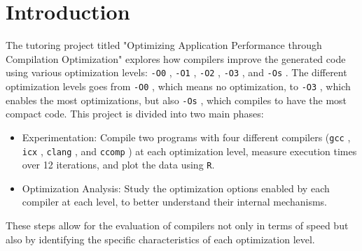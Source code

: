 \documentclass{rapport}
\newcommand{\gcc}{\texttt{gcc} }
\newcommand{\icx}{\texttt{icx} }
\newcommand{\clang}{\texttt{clang} }
\newcommand{\comp}{\texttt{ccomp} }
\newcommand{\optizero}{\texttt{-O0} }
\newcommand{\optione}{\texttt{-O1} }
\newcommand{\optitwo}{\texttt{-O2} }
\newcommand{\optithree}{\texttt{-O3} }
\newcommand{\optisize}{\texttt{-Os} }
\begin{document}
\clearpage

\section*{Introduction}
The tutoring project titled "Optimizing Application Performance through Compilation Optimization" explores how compilers improve the generated code 
using various optimization levels: \optizero, \optione, \optitwo, \optithree, and \optisize. \newline
The different optimization levels goes from \optizero, which means no optimization, to \optithree, which enables the most optimizations, but also \optisize, which
compiles to have the most compact code.\newline
This project is divided into two main phases:
\begin{itemize}
    \item Experimentation: Compile two programs with four different compilers (\gcc, \icx, \clang, and \comp) at each optimization level, 
    measure execution times over 12 iterations, and plot the data using \texttt{R}.
    \item Optimization Analysis: Study the optimization options enabled by each compiler at each level, to better understand their internal mechanisms.
\end{itemize}
These steps allow for the evaluation of compilers not only in terms of speed but also by identifying the specific characteristics of each optimization level.
\end{document}

